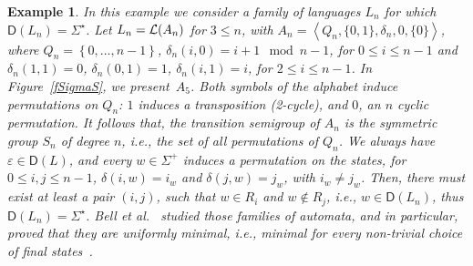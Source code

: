 \documentclass{article}
\newtheorem{example}{Example}
\newcommand{\dis}[1]{\mathsf{D}(#1)}
\newcommand{\Set}[1]{\left\{ #1 \right\}}
\newcommand{\tuple}[1]{\left\langle #1\right\rangle}
\newcommand{\lang}[1]{{\cal L}(#1)}
\begin{document}
\begin{example}
\label{ex:symmerysg}
In this example we consider a family of languages $L_n$ for which $\dis{L_n}=\Sigma^\star$.
Let $L_n=\lang{A_n}$ for $3\leq n$,  with
$A_n=\tuple{Q_n,\{0,1\},\delta_n,0,\{0\}}$,  
where $Q_n=\Set{0,\ldots,n-1}$, 
$\delta_n(i,0)=i+1\mod{n-1}$, for $0\leq i\leq n-1$ and 
$\delta_n(1,1)=0$, $\delta_n(0,1)=1$,  $\delta_n(i,1)=i$, for $2\leq
i\leq n-1$.  
In Figure~\ref{fSigmaS}, we present~$A_5$.   
Both symbols of the alphabet induce permutations on $Q_n$: $1$ induces
a transposition (2-cycle), and  $0$, an $n$ cyclic permutation. It
follows that, the transition semigroup of $A_n$  
is the symmetric group $S_n$ of degree $n$, i.e., the set of all
permutations of $Q_n$.  
We always have  $\varepsilon\in\dis{L}$, and  
 every $w\in \Sigma^+$ induces a permutation on the states, 
for  $0\leq i,j\leq n-1$, $\delta(i,w)=i_w$ and  $\delta(j,w)=j_w$,
with $i_w\neq j_w$.  
Then, there must exist at least a pair $(i,j)$, such that $w\in R_i$ and
$w\notin R_j$, i.e., 
 $w\in  \dis{L_n}$,  thus $\dis{L_n}=\Sigma^\star$. 
Bell et al.~\cite{bell14:_symmet_group_and_quotien_compl}
studied those families of automata,  
and in particular, proved that they are uniformly minimal, i.e.,
minimal for every non-trivial choice of final
states~\cite{restivo12:_graph_theor_approac_to_autom_minim}.  
\end{example}
\end{document}
